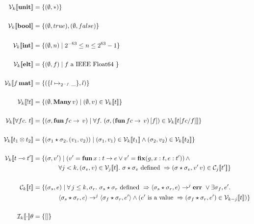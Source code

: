 \begin{align*}
  \V{k}{ \Unit } &= \{ (\empH, \ast) \} \\
\\
    \V{k}{ \Bool } &= \{ (\empH, true), (\empH, false) \} \\
\\
    \V{k}{ \Int } &= \{ (\empH, n) \mid 2^{-63} \leq n \leq 2^{63} -1 \} \\
\\
    \V{k}{ \Elt } &= \{ (\empH, f) \mid f \textrm{ a IEEE Float64 } \} \\
\\
    \V{k}{ f \, \Mat } &= \{ (\{ l \mapsto_{2^{-f}} \_ \} , l) \} \\
\\
    \V{k}{ \Bang t } &= \{ (\empH, \Many\, v) \mid (\empH, v) \in \V{k}{t} \} \\
\\
    \V{k}{ \forall fc.\  t } &= \{ (\sigma, \ottkw{fun}\, fc \rightarrow \, v) \mid \forall f.\ (\sigma, (\ottkw{fun}\, fc \rightarrow \, v)\, [ f ]) \in \V{k}{ t [ fc / f ] } \} \\
\\
    \V{k}{ t_1 \otimes t_2 } &= \{ (\sigma_1 \star \sigma_2, ( v_1, v_2 )) \mid (\sigma_1, v_1) \in \V{k}{t_1} \wedge (\sigma_2, v_2) \in \V{k}{t_2} \} \\
\\
    \V{k}{ t \multimap t' } &= \{ (\sigma, v' ) \mid ( v' = \ottkw{fun}\, x : t \rightarrow e \vee v' = \ottkw{fix} (g, x : t, e : t') ) \, \wedge\\
                            & \qquad \qquad \forall j < k, (\sigma_v, v) \in \V{j}{ t }.\ \sigma \star \sigma_v \textrm{ defined } \Rightarrow (\sigma \star \sigma_v, v'\, v) \in \C{j}{ t' } \} \\
\\
    \C{k}{ t } &= \{ (\sigma_s, e) \mid \forall \, j \leq k, \sigma_r.\ \sigma_s \star \sigma_r \textrm{ defined } \Rightarrow \langle \sigma_s \star \sigma_r, e \rangle \rightarrow^j \ottkw{err}\ \vee \exists \sigma_f, e'.\\
               & \qquad \qquad \langle \sigma_s \star \sigma_r, e \rangle \rightarrow^j \langle \sigma_f \star \sigma_r, e' \rangle \wedge ( e' \textrm { is a value } \Rightarrow ( \sigma_f \star \sigma_r, e' ) \in \V{k-j}{t} ) \} \\
\\
    \den{I}{k}{ \cdot } \theta &= \{ [] \} \\
\\

\end{align*}
